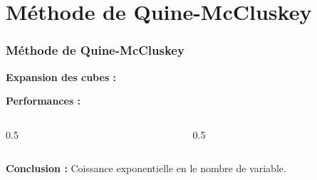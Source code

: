 \documentclass[handout]{beamer}
\newcommand{\tick}{\ding{52}}
\begin{document}
\section{M\'ethode de Quine-McCluskey}
\begin{frame}
  \frametitle{M\'ethode de Quine-McCluskey}
  
  \textbf{Expansion des cubes :}
  
     \begin{tikzpicture}[scale=2]
     
     \end{tikzpicture}
     \vfill\null

  \textbf{Performances :}     
     
     \begin{columns}
     	\begin{column}[t]{0.5\hsize}
	     \begin{tikzpicture}[scale=0.8]
    	 
	     \end{tikzpicture}
	     \end{column}

     
	     \begin{column}[t]{0.5\hsize}
	     \begin{tikzpicture}[scale=0.8]
    	 
	     \end{tikzpicture}
    	 \end{column} 
	  \end{columns}
	  
	\vfill\null
	\textbf{Conclusion : } Coissance exponentielle en le nombre de variable.
	  
%
%  
  
  
  
\end{frame}
\end{document}
